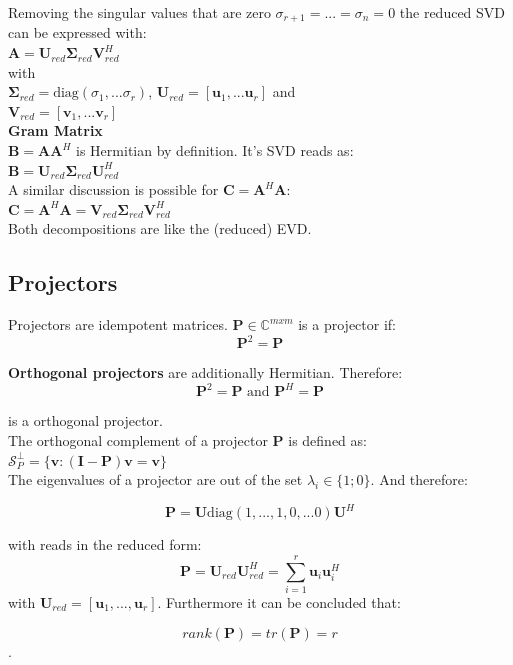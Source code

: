 \documentclass[english]{latex4ei/latex4ei_sheet}
\begin{document}
\begin{sectionbox}
Removing the singular values that are zero $\sigma_{r+1}=...=\sigma_{n}=0$ the reduced SVD can be expressed with:\\

$\mathbf{A} = \mathbf{U}_{red}\mathbf{\Sigma}_{red}\mathbf{V}^H_{red}$\\
with\\
$\mathbf{\Sigma}_{red} = \text{diag}(\sigma_1, ...\sigma_r)$, 
$\mathbf{U}_{red} = [\mathbf{u}_1, ...\mathbf{u}_r]$ and\\
$\mathbf{V}_{red} = [\mathbf{v}_1, ...\mathbf{v}_r]$\\

\textbf{Gram Matrix}\\

$\mathbf{B} = \mathbf{A}\mathbf{A}^H$ is Hermitian by definition. It's SVD reads as:\\

$\mathbf{B} = \mathbf{U}_{red}\mathbf{\Sigma}_{red}\mathbf{U}_{red}^H$\\
A similar discussion is possible for $\mathbf{C} = \mathbf{A}^H\mathbf{A}$:\\

$\mathbf{C}=\mathbf{A}^H\mathbf{A} = \mathbf{V}_{red}\mathbf{\Sigma}_{red}\mathbf{V}^H_{red}$\\

Both decompositions are like the (reduced) EVD.\\

\end{sectionbox}
\begin{sectionbox}
\subsection{Projectors}
Projectors are idempotent matrices. $\mathbf{P} \in \mathbb{C}^{mxm}$ is a projector if:\\
$$\mathbf{P}^2 = \mathbf{P}$$

\textbf{Orthogonal projectors} are additionally Hermitian. Therefore:\\
$$\mathbf{P}^2 = \mathbf{P} \text{ and } \mathbf{P}^H=\mathbf{P}$$

is a orthogonal projector.\\

The orthogonal complement of a projector $\mathbf{P}$ is defined as:\\
$\mathcal{S}_P^\perp = \{\mathbf{v}: (\mathbf{I}-\mathbf{P})\mathbf{v}=\mathbf{v}\}$\\

The eigenvalues of a projector are out of the set $\lambda_i\in\{1;0\}$. And therefore:

$$\mathbf{P} = \mathbf{U}\text{diag}(1,...,1,0,...0)\mathbf{U}^H$$

with reads in the reduced form:
$$\mathbf{P} = \mathbf{U}_{red}\mathbf{U}_{red}^H = \sum_{i=1}^{r}\mathbf{u}_i\mathbf{u}_i^H$$
with $\mathbf{U}_{red} = [\mathbf{u}_1,...,\mathbf{u}_r]$. 
Furthermore it can be concluded that:

$$rank(\mathbf{P}) = tr(\mathbf{P}) =r$$.
\end{sectionbox}
\end{document}
